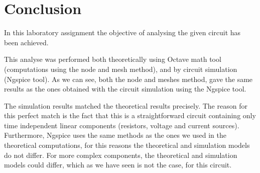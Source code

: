 \section{Conclusion}
\label{sec:conclusion}



In this laboratory assignment the objective of analysing the given circuit has been
achieved.\par 
This analyse was performed both theoretically using Octave math tool (computations using the node and mesh method), and by circuit simulation (Ngspice tool).
As we can see, both the node and meshes method, gave the same results as the ones obtained with the circuit simulation using the Ngspice tool. \par
The simulation results matched the theoretical results
precisely. 
The reason for this perfect match is the fact that this is a
straightforward circuit containing only time independent linear components (resistors, voltage and current sources). Furthermore, Ngspice uses the same methods as the ones we used in the theoretical computations, for this reasons the theoretical
and simulation models do not differ. For more complex components, the
theoretical and simulation models could differ, which as we have seen is not the case, for this circuit.
